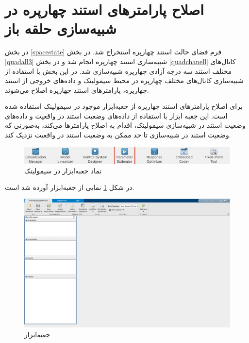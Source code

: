\section{اصلاح پارامتر‌های  استند چهارپره در شبیه‌سازی حلقه باز}
در بخش
\ref{spacestate}
فرم فضای حالت استند چهارپره استخراج شد. در بخش
\ref{quadall3}
شبیه‌سازی استند چهارپره انجام شد و در بخش
\ref{quadchanell}
کانال‌های مختلف استند سه درجه آزادی چهارپره شبیه‌سازی شد.
در این بخش با استفاده از شبیه‌سازی کانال‌های مختلف چهارپره در محیط سیمولینک و داده‌های خروجی  از استند چهارپره، پارامترهای استند چهارپره اصلاح می‌شوند.

برای اصلاح پارامترهای استند چهارپره از جعبه‌ابزار
موجود در سیمولینک
استفاده شده است.
این جعبه ابزار با استفاده از داده‌های وضعیت استند در واقعیت و داده‌های وضعیت استند در شبیه‌سازی سیمولینک، اقدام به اصلاح پارامترها می‌کند، به‌صورتی که وضعیت استند در شبیه‌سازی تا حد ممکن به  وضعیت استند در واقعیت نزدیک کند.



\begin{figure}[H]
	\includegraphics[width=12cm]{../Figures/QuadSimulation/ParameterEstimation/PS_icon.png}
	\centering
	\caption{نماد جعبه‌ابزار
در سیمولینک}
\end{figure}
در شکل
\ref{PS}
نمایی از جعبه‌ابزار
 آورده شد است.





\begin{figure}[H]
	\includegraphics[width=12cm]{../Figures/QuadSimulation/ParameterEstimation/PS_app.png}
	\centering
	\caption{جعبه‌ابزار
	}
	\label{PS}
\end{figure}

